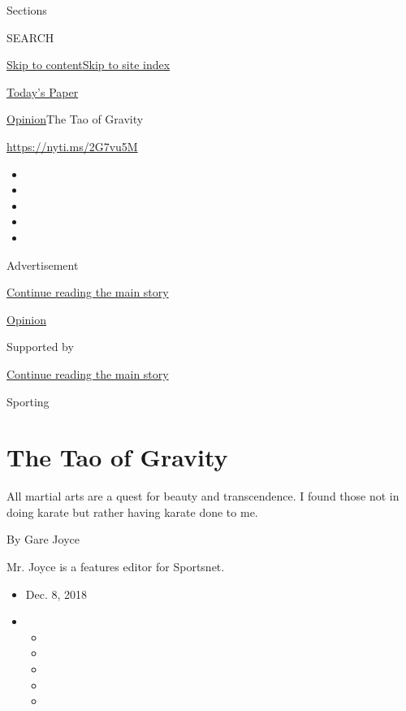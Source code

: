 Sections

SEARCH

\protect\hyperlink{site-content}{Skip to
content}\protect\hyperlink{site-index}{Skip to site index}

\href{https://myaccount.nytimes.com/auth/login?response_type=cookie\&client_id=vi}{}

\href{https://www.nytimes.com/section/todayspaper}{Today's Paper}

\href{/section/opinion}{Opinion}\textbar{}The Tao of Gravity

\href{https://nyti.ms/2G7vu5M}{https://nyti.ms/2G7vu5M}

\begin{itemize}
\item
\item
\item
\item
\item
\end{itemize}

Advertisement

\protect\hyperlink{after-top}{Continue reading the main story}

\href{/section/opinion}{Opinion}

Supported by

\protect\hyperlink{after-sponsor}{Continue reading the main story}

Sporting

\hypertarget{the-tao-of-gravity}{%
\section{The Tao of Gravity}\label{the-tao-of-gravity}}

All martial arts are a quest for beauty and transcendence. I found those
not in doing karate but rather having karate done to me.

By Gare Joyce

Mr. Joyce is a features editor for Sportsnet.

\begin{itemize}
\item
  Dec. 8, 2018
\item
  \begin{itemize}
  \item
  \item
  \item
  \item
  \item
  \end{itemize}
\end{itemize}

